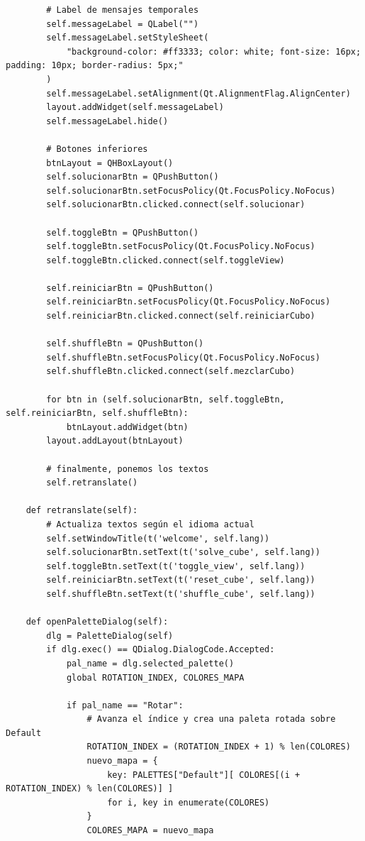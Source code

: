 \begin{lstlisting}
        # Label de mensajes temporales
        self.messageLabel = QLabel("")
        self.messageLabel.setStyleSheet(
            "background-color: #ff3333; color: white; font-size: 16px; padding: 10px; border-radius: 5px;"
        )
        self.messageLabel.setAlignment(Qt.AlignmentFlag.AlignCenter)
        layout.addWidget(self.messageLabel)
        self.messageLabel.hide()

        # Botones inferiores
        btnLayout = QHBoxLayout()
        self.solucionarBtn = QPushButton()
        self.solucionarBtn.setFocusPolicy(Qt.FocusPolicy.NoFocus)
        self.solucionarBtn.clicked.connect(self.solucionar)

        self.toggleBtn = QPushButton()
        self.toggleBtn.setFocusPolicy(Qt.FocusPolicy.NoFocus)
        self.toggleBtn.clicked.connect(self.toggleView)

        self.reiniciarBtn = QPushButton()
        self.reiniciarBtn.setFocusPolicy(Qt.FocusPolicy.NoFocus)
        self.reiniciarBtn.clicked.connect(self.reiniciarCubo)

        self.shuffleBtn = QPushButton()
        self.shuffleBtn.setFocusPolicy(Qt.FocusPolicy.NoFocus)
        self.shuffleBtn.clicked.connect(self.mezclarCubo)

        for btn in (self.solucionarBtn, self.toggleBtn, self.reiniciarBtn, self.shuffleBtn):
            btnLayout.addWidget(btn)
        layout.addLayout(btnLayout)

        # finalmente, ponemos los textos
        self.retranslate()
        
    def retranslate(self):
        # Actualiza textos según el idioma actual
        self.setWindowTitle(t('welcome', self.lang))
        self.solucionarBtn.setText(t('solve_cube', self.lang))
        self.toggleBtn.setText(t('toggle_view', self.lang))
        self.reiniciarBtn.setText(t('reset_cube', self.lang))
        self.shuffleBtn.setText(t('shuffle_cube', self.lang))
        
    def openPaletteDialog(self):
        dlg = PaletteDialog(self)
        if dlg.exec() == QDialog.DialogCode.Accepted:
            pal_name = dlg.selected_palette()
            global ROTATION_INDEX, COLORES_MAPA

            if pal_name == "Rotar":
                # Avanza el índice y crea una paleta rotada sobre Default
                ROTATION_INDEX = (ROTATION_INDEX + 1) % len(COLORES)
                nuevo_mapa = {
                    key: PALETTES["Default"][ COLORES[(i + ROTATION_INDEX) % len(COLORES)] ]
                    for i, key in enumerate(COLORES)
                }
                COLORES_MAPA = nuevo_mapa


\end{lstlisting}
